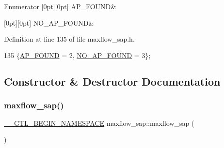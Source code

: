 \begin{DoxyEnumFields}{Enumerator}
[0pt][0pt]{}\mbox{\label{classmaxflow__sap_ac30ce6f46eb2dc97b557297c48989f8ea8438edbbdad4a54eea6615f442dcda37}} 
A\+P\+\_\+\+F\+O\+U\+ND&\\
\hline

[0pt][0pt]{}\mbox{\label{classmaxflow__sap_ac30ce6f46eb2dc97b557297c48989f8ea73e7133865255ad10aebb463b1abb20f}} 
N\+O\+\_\+\+A\+P\+\_\+\+F\+O\+U\+ND&\\
\hline

\end{DoxyEnumFields}


Definition at line 135 of file maxflow\+\_\+sap.\+h.


\begin{DoxyCode}
135 \{\mbox{\hyperlink{classmaxflow__sap_ac30ce6f46eb2dc97b557297c48989f8ea8438edbbdad4a54eea6615f442dcda37}{AP\_FOUND}} = 2, \mbox{\hyperlink{classmaxflow__sap_ac30ce6f46eb2dc97b557297c48989f8ea73e7133865255ad10aebb463b1abb20f}{NO\_AP\_FOUND}} = 3\};
\end{DoxyCode}


\subsection{Constructor \& Destructor Documentation}
\mbox{\label{classmaxflow__sap_aa149130d8cf969f0b96aff72331bd48f}} 
\subsubsection{\texorpdfstring{maxflow\+\_\+sap()}{maxflow\_sap()}}
{\footnotesize\ttfamily \mbox{\hyperlink{_g_t_l_8h_a2d9f24096ac60918452dd51f32b64aa9}{\+\_\+\+\_\+\+G\+T\+L\+\_\+\+B\+E\+G\+I\+N\+\_\+\+N\+A\+M\+E\+S\+P\+A\+CE}} maxflow\+\_\+sap\+::maxflow\+\_\+sap (\begin{DoxyParamCaption}{ }\end{DoxyParamCaption})}

